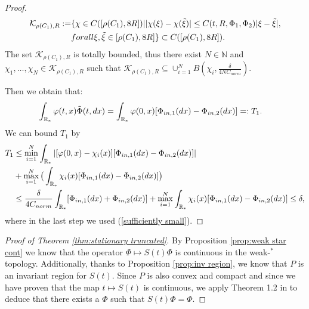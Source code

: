 \documentclass[11pt]{article}
\numberwithin{equation}{section}
\theoremstyle{plain}
\newcommand{\der}{\textup{d}}
\begin{document}
\begin{proof}
\begin{align*}
    \mathcal{K}_{\rho(C_{1}),R}:=&\{\chi\in\textup{C}([\rho(C_{1}),8R])| |\chi(\xi)-\chi(\tilde{\xi})|\leq C(t,R,\Phi_{1},\Phi_{2})|\xi-\tilde{\xi}|,\\
    &\textup{ for all } \xi, \tilde{\xi}\in[\rho(C_{1}),8R]\}\subset \textup{C}([\rho(C_{1}),8R]).
\end{align*}
The set $ \mathcal{K}_{\rho(C_{1}),R}$ is totally bounded, thus there exist $N\in\mathbb{N}$ and $\chi_{1},\ldots,\chi_{N}\in  \mathcal{K}_{\rho(C_{1}),R}$ such that $ \mathcal{K}_{\rho(C_{1}),R}\subseteq \cup_{i=1}^{N}B(\chi_{i}, \frac{\delta}{4N C_{norm}})$.

Then we obtain that:
\begin{align}
\int_{\mathbb R_*} \varphi(t,x) \tilde{\Phi}(t, \der x)&=\int_{\mathbb R_*} \varphi(0,x) [{\Phi_{\textup{in},1}}(\der x)-{\Phi_{\textup{in},2}}( \der x)] =:T_{1}. \label{conclusion}
\end{align} 
We can bound $T_{1}$ by
\begin{align*}
 T_{1}&\leq \min_{i=1}^{N}\int_{\mathbb R_*} |[\varphi(0,x)-\chi_{i}(x) ][{\Phi_{\textup{in},1}}(\der x)-{\Phi_{\textup{in},2}}( \der x)] | \\
 &+\max_{i=1}^{N}\big(\int_{\mathbb R_*} \chi_{i}(x) [{\Phi_{\textup{in},1}}(\der x)-{\Phi_{\textup{in},2}}( \der x)]\big)\\
 &\leq\frac{\delta}{4C_{norm}}\int_{\mathbb R_*}  [{\Phi_{\textup{in},1}}(\der x)+{\Phi_{\textup{in},2}}( \der x)]  + \max_{i=1}^{N}\int_{\mathbb R_*} \chi_{i}(x) [{\Phi_{\textup{in},1}}(\der x)-{\Phi_{\textup{in},2}}( \der x)]\leq \delta,
\end{align*}
where in the last step we used (\ref{sufficiently small}).
\end{proof}
\begin{proof}[Proof of Theorem \ref{thm:stationary truncated}]
By Proposition \ref{prop:weak star cont} we know that the operator $\Phi \mapsto S(t) \Phi$ is continuous in the  weak-$^{\ast}$ topology. 
Additionally, thanks to Proposition \ref{prop:inv region}, we know that $P$ is an invariant region for $S(t)$. 
Since $P$ is also convex and compact and since we have proven that the map $t \mapsto S(t)$ is continuous,  we apply Theorem 1.2 in \cite{escobedo2005self} to deduce that there exists a $\Phi $ such that $S(t)\Phi=\Phi$.  
\end{proof}
\end{document}
